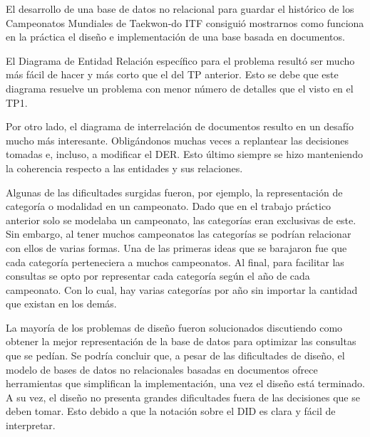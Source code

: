 El desarrollo de una base de datos no relacional para guardar el histórico de los Campeonatos Mundiales de
Taekwon-do ITF consiguió mostrarnos como funciona en la práctica el diseño e implementación de una base basada en
documentos.

El Diagrama de Entidad Relación específico para el problema resultó ser mucho más fácil de hacer y más corto que el del TP anterior.
Esto se debe que este diagrama resuelve un problema con menor número de detalles que el visto en el TP1.

Por otro lado, el diagrama de interrelación de documentos resulto en un desafío mucho más interesante. Obligándonos
muchas veces a replantear las decisiones tomadas e, incluso, a modificar el DER. Esto último siempre se hizo
manteniendo la coherencia respecto a las entidades y sus relaciones.

Algunas de las dificultades surgidas fueron, por ejemplo,
la representación de categoría o modalidad en un campeonato. Dado que en el trabajo práctico anterior solo se modelaba un
campeonato, las categorías eran exclusivas de este. Sin embargo, al tener muchos campeonatos las categorías se podrían
relacionar con ellos de varias formas. Una de las primeras ideas que se barajaron fue que cada categoría perteneciera a
muchos campeonatos. Al final, para facilitar las consultas se opto por representar cada categoría según el año de cada
campeonato. Con lo cual, hay varias categorías por año sin importar la cantidad que existan en los demás.

La mayoría de los problemas de diseño fueron solucionados discutiendo como obtener la mejor representación de la base de datos
para optimizar las consultas que se pedían. Se podría concluir que, a pesar de las dificultades de diseño, el modelo de
bases de datos no relacionales basadas en documentos ofrece herramientas que simplifican la implementación, una vez el
diseño está terminado. A su vez, el diseño no presenta grandes dificultades fuera de las decisiones que se deben tomar.
Esto debido a que la notación sobre el DID es clara y fácil de interpretar.
